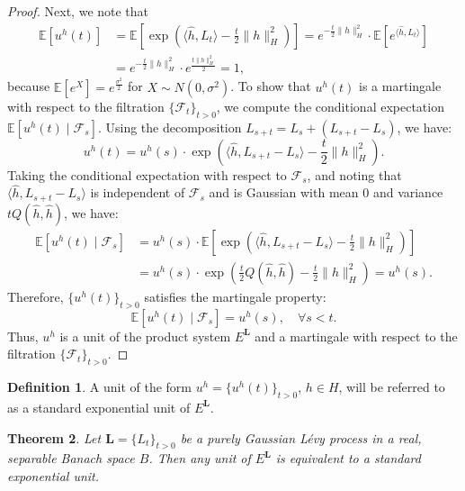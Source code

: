 \documentclass[11pt]{amsart}
\newtheorem{theorem}{Theorem}[section]
\theoremstyle{definition}
\newtheorem{definition}[theorem]{Definition}
\theoremstyle{remark}
\numberwithin{equation}{section}
\begin{document}
\begin{proof}
Next, we note that
\begin{align*}
\mathbb{E}\left[ u^h(t) \right]& = \mathbb{E}\left[ \exp\left( \langle \hat{h}, L_t \rangle - \frac{t}{2} \| h \|_H^2 \right) \right] = e^{ - \frac{t}{2} \| h \|_H^2 } \cdot \mathbb{E}\left[ e^{ \langle \hat{h}, L_t \rangle } \right] \\&= e^{ - \frac{t}{2} \| h \|_H^2 } \cdot e^{ \frac{t \| h \|_H^2 }{2} } = 1,
\end{align*}
because \( \mathbb{E}[e^{X}] = e^{\frac{\sigma^2}{2}}\) for \(X \sim N(0, \sigma^2)\).
To show that \( u^h(t) \) is a martingale with respect to the filtration \( \{ \mathcal{F}_t \}_{t > 0} \), we compute the conditional expectation
\(
\mathbb{E}\left[ u^h(t) \mid \mathcal{F}_s \right].
\)
Using the decomposition \( L_{s+t} = L_s + (L_{s+t} - L_s) \), we have:
\[
u^h(t) = u^h(s) \cdot \exp\left( \langle \hat{h}, L_{s+t} - L_s \rangle - \frac{t}{2} \| h \|_H^2 \right).
\]
Taking the conditional expectation with respect to \( \mathcal{F}_s \), and noting that \( \langle \hat{h}, L_{s+t} - L_s \rangle \) is independent of \( \mathcal{F}_s \) and is Gaussian with mean \( 0 \) and variance \( t Q(\hat{h}, \hat{h}) \), we have:
\[
\begin{aligned}
\mathbb{E}\left[ u^h(t) \mid \mathcal{F}_s \right] &= u^h(s) \cdot \mathbb{E}\left[ \exp\left( \langle \hat{h}, L_{s+t} - L_s \rangle - \frac{t}{2} \| h \|_H^2 \right) \right] \\
&= u^h(s) \cdot \exp\left(  \frac{t}{2} Q(\hat{h}, \hat{h})-\frac{t}{2} \| h \|_H^2 \right)= u^h(s) .
\end{aligned}\]
Therefore, \( \{ u^h(t) \}_{t > 0} \) satisfies the martingale property:
\[
\mathbb{E}\left[ u^h(t) \mid \mathcal{F}_s \right] = u^h(s), \quad \forall s < t.
\]
Thus, \( u^h \) is a unit of the product system \( E^{\bm{L}} \) and a martingale with respect to the filtration \( \{ \mathcal{F}_t \}_{t > 0} \).
\end{proof}
\begin{definition}
A unit of the form \( u^h = \{u^{h}(t)\}_{t > 0} \), \(h\in H\), will be referred to as a standard exponential unit of \( E^{\bm{L}} \).
\end{definition}
\begin{theorem}\label{main1}
Let \( \bm{L} = \{L_t\}_{t > 0} \) be a purely Gaussian L\'evy process in a real, separable Banach space \( B \). Then any unit of \( E^{\bm{L}} \) is equivalent to a standard exponential unit.
\end{theorem}
\end{document}
